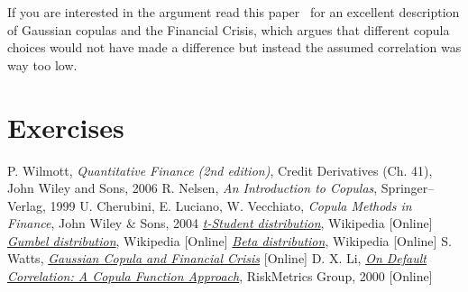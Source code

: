 If you are interested in the argument read this paper~\cite{bib:copula_and_2008} for an excellent description of Gaussian copulas and the Financial Crisis, which argues that different copula choices would not have made a difference but instead the assumed correlation was way too low.

\section*{Exercises}


\begin{thebibliography}{9}
P. Wilmott, \emph{Quantitative Finance (2nd edition)}, Credit Derivatives (Ch. 41), John Wiley and Sons, 2006 
R. Nelsen, \emph{An Introduction to Copulas}, Springer–Verlag, 1999
U. Cherubini, E. Luciano, W. Vecchiato, \emph{Copula Methods in Finance}, John Wiley \& Sons, 2004
\href{https://en.wikipedia.org/wiki/Student\%27s\_t-distribution}{\emph{t-Student distribution}}, Wikipedia [Online]
\href{https://en.wikipedia.org/wiki/Gumbel_distribution}{\emph{Gumbel distribution}}, Wikipedia [Online]
\href{https://en.wikipedia.org/wiki/Beta_distribution}{\emph{Beta distribution}}, Wikipedia [Online]
 S. Watts, \href{http://samueldwatts.com/wp-content/uploads/2016/08/Watts-Gaussian-Copula_Financial_Crisis.pdf}{\emph{Gaussian Copula and Financial Crisis}} [Online]
D. X. Li, \href{http://www.maths.lth.se/matstat/kurser/fmsn15masm23/default.pdf}{\emph{On Default Correlation: A Copula Function Approach}}, RiskMetrics Group, 2000 [Online]
\end{thebibliography}
